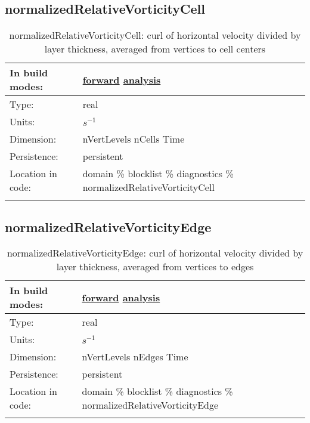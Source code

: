 \subsection[normalizedRelativeVorticityCell]{normalizedRelativeVorticityCell}
\label{subsec:var_sec_diagnostics_normalizedRelativeVorticityCell}
\begin{center}
\begin{longtable}{| p{2.0in} | p{4.0in} |}
        \hline 
        In build modes: & \hyperref[subsec:forward_var_tab_diagnostics]{forward} \hyperref[subsec:analysis_var_tab_diagnostics]{analysis} \\
        \hline 
        Type: & real \\
        \hline 
        Units: & $s^{-1}$ \\
        \hline 
        Dimension: & nVertLevels nCells Time \\
        \hline 
        Persistence: & persistent \\
        \hline 
		 Location in code: & domain \% blocklist \% diagnostics \% normalizedRelativeVorticityCell \\
		 \hline 
    \caption{normalizedRelativeVorticityCell: curl of horizontal velocity divided by layer thickness, averaged from vertices to cell centers}
\end{longtable}
\end{center}
\subsection[normalizedRelativeVorticityEdge]{normalizedRelativeVorticityEdge}
\label{subsec:var_sec_diagnostics_normalizedRelativeVorticityEdge}
\begin{center}
\begin{longtable}{| p{2.0in} | p{4.0in} |}
        \hline 
        In build modes: & \hyperref[subsec:forward_var_tab_diagnostics]{forward} \hyperref[subsec:analysis_var_tab_diagnostics]{analysis} \\
        \hline 
        Type: & real \\
        \hline 
        Units: & $s^{-1}$ \\
        \hline 
        Dimension: & nVertLevels nEdges Time \\
        \hline 
        Persistence: & persistent \\
        \hline 
		 Location in code: & domain \% blocklist \% diagnostics \% normalizedRelativeVorticityEdge \\
		 \hline 
    \caption{normalizedRelativeVorticityEdge: curl of horizontal velocity divided by layer thickness, averaged from vertices to edges}
\end{longtable}
\end{center}
